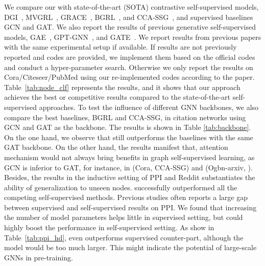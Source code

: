 { 
We compare our \model with state-of-the-art (SOTA) contrastive self-supervised models, DGI~\cite{velivckovic2018deep}, MVGRL~\cite{hassani2020contrastive}, GRACE~\cite{zhu2020deep}, BGRL~\cite{thakoor2021bootstrapped}, and CCA-SSG~\cite{zhang2021canonical}, and supervised baselines GCN and GAT. We also report the results of previous generative self-supervised models, GAE~\cite{kipf2016variational}, GPT-GNN~\cite{hu2020gpt}, and GATE~\cite{amin2020gate}.
We report results from previous papers with the same experimental setup if available. If results are not previously reported and codes are provided, we implement them based on the official codes and conduct a hyper-parameter search. Otherwise we only report the results on Cora/Citeseer/PubMed using our re-implemented codes according to the paper. Table~\ref{tab:node_clf} represents the results, and it shows that our approach achieves the best or competitive results compared to the state-of-the-art self-supervised approaches. To test the influence of different GNN backbones, we also compare the best baselines, BGRL and CCA-SSG, in citation networks using GCN and GAT as the backbone. The results is shown in Table \ref{tab:backbone}. On the one hand, we observe that \model still outperforms the baselines with the same GAT backbone. 
On the other hand, the results manifest that, attention mechanism would not always bring benefits in graph self-supervised learning, as GCN is inferior to GAT, for instance, in (Cora, CCA-SSG) and (Ogbn-arxiv, \model).
Besides, the results in the inductive setting of PPI and Reddit substantiates the ability of generalization to unseen nodes. \model successfully outperformed all the competing self-supervised methods.  
Previous studies often reports a large gap between supervised and self-supervised results on PPI. We found that increasing the number of model parameters helps little in supervised setting, but could highly boost the performance in self-supervised setting. As show in Table~\ref{tab:ppi_hd}, \model even outperforms supervised counter-part, although the model would be too much larger. This might indicate the potential of large-scale GNNs in pre-training.





}
